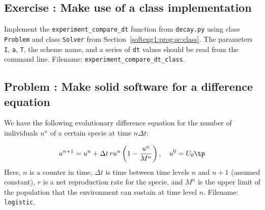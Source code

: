 \documentclass[graybox,sectrefs,envcountresetchap,open=right,final]{svmonodo}
\newenvironment{doconceexercise}{}{}
\newcounter{doconceexercisecounter}
\begin{document}
\begin{doconceexercise}

\subsection*{Exercise \thedoconceexercisecounter: Make use of a class implementation}

\label{softeng1:exer:class:dts}

Implement the \Verb!experiment_compare_dt! function from \texttt{decay.py}
using class \texttt{Problem} and class \texttt{Solver} from
Section~\ref{softeng1:prog:se:class}.
The parameters \texttt{I}, \texttt{a}, \texttt{T}, the scheme name, and a series of
\texttt{dt} values should be read from the command line.
\noindent Filename: \Verb!experiment_compare_dt_class!.

\end{doconceexercise}




\begin{doconceexercise}

\subsection*{Problem \thedoconceexercisecounter: Make solid software for a difference equation}

\label{softeng1:exer:logistic}

We have the following evolutionary difference equation for the number
of individuals $u^n$ of a certain specie at time $n\Delta t$:

\begin{equation}
u^{n+1} = u^n + \Delta t\, r u^n\left(1 - \frac{u^n}{M^n}\right),
\quad u^0=U_0\tp
\label{softeng1:exer:logistic:eq}
\end{equation}
Here, $n$ is a counter in time, $\Delta t$ is time between time levels
$n$ and $n+1$ (assumed constant), $r$ is a net reproduction rate
for the specie,
and $M^n$ is the upper limit of the population that the environment can
sustain at time level $n$.
\noindent Filename: \texttt{logistic}.

\end{doconceexercise}



\clearemptydoublepage
{}
\thispagestyle{empty}





\cleardoublepage{}  %
\printindex
\end{document}
